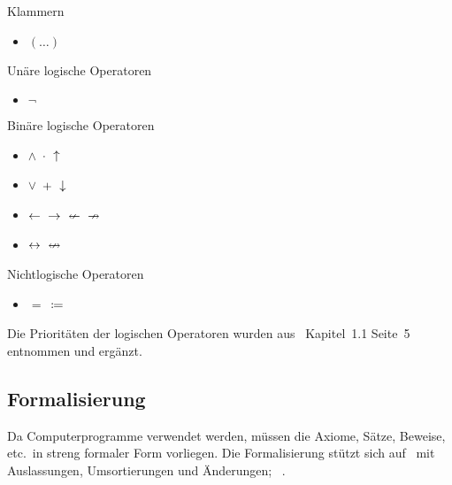 \documentclass[english,ngerman,parskip=half,headsepline,footsepline]{scrreprt}
\makeatletter
\newcommand*{\textetc}{etc.\@}
\newcommand*{\clq}{'} %
\newcommand*{\crq}{'} %
\newcommand*{\cse}{, } %
\newcommand*{\csp}{\crqt\cset\clqt} %
\newcommand*{\clqt}{} %
\newcommand*{\crqt}{} %
\newcommand*{\cset}{~} %
\newcommand*{\cspt}{\crqt\cset\clqt} %
\makeatother
\begin{document}
	{
		\renewcommand*{\clq}{}
		\renewcommand*{\crqt}{}
		\renewcommand*{\cse}{~}

		Klammern
		\begin{itemize}
			\item \clqt$(\dots)$\crqt
		\end{itemize}

		Unäre logische Operatoren
		\begin{itemize}
			\item \clqt$\lnot$\crqt
		\end{itemize}

		Binäre logische Operatoren
		\begin{itemize}
			\item \clqt$\land$\cspt$\cdot$\cspt$\uparrow$\crqt

			\item \clqt$\lor$\cspt$+$\cspt$\downarrow$\crqt


			\item \clqt$\leftarrow$\cspt$\rightarrow$\cspt$\nleftarrow$\cspt$\nrightarrow$\crqt

			\item \clqt$\leftrightarrow$\cspt$\nleftrightarrow$\crqt
		\end{itemize}

		Nichtlogische Operatoren
		\begin{itemize}
			\item \clqt$=$\cspt$\coloneqq$\crqt
		\end{itemize}
	}

	Die Prioritäten der logischen Operatoren wurden aus~\cite{bib:Rautenberg} Kapitel~1.1 Seite~5 entnommen und ergänzt.

	\subsection{Formalisierung} %
	\label{sub:Formalisierung}

	Da Computerprogramme verwendet werden, müssen die Axiome, Sätze, Beweise, \textetc\ in streng formaler Form vorliegen. Die Formalisierung stützt sich auf~\cite{bib:Aussagenlogik} mit Auslassungen, Umsortierungen und Änderungen; \alsoname~\cite{bib:LogikDe, bib:LogikEn}.
\end{document}
